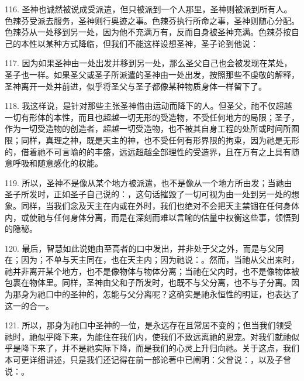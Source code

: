 116. 圣神也诚然被说成受派遣，但只被派到一个人那里，圣神则被派到所有人。色辣芬受派去服务，圣神则行奥迹之事。色辣芬执行所命之事，圣神则随心分配。色辣芬从一处移到另一处，因为他不充满万有，反而自身被圣神充满。色辣芬按自己的本性以某种方式降临，但我们不能这样设想圣神，圣子论到他说：\par

117. 因为如果圣神由一处出发并移到另一处，那么圣父自己也会被发现在某处，圣子也一样。如果圣父或圣子所派遣的圣神由一处出发，按照那些不虔敬的解释，圣神离开一处并前进，似乎将圣父与圣子都像某种物质身体一样留下了。\par

118. 我这样说，是针对那些主张圣神借由运动而降下的人。但圣父，祂不仅超越一切有形体的本性，而且也超越一切无形的受造物，不受任何地方的局限；圣子，作为一切受造物的创造者，超越一切受造物，也不被其自身工程的处所或时间所囿限；同样，真理之神，既是天主的神，也不受任何有形界限的拘束，因为祂是无形的，借着祂不可言喻的的丰盛，远远超越全部理性的受造界，且在万有之上具有随意呼吸和随意感化的权能。\par

119. 所以，圣神不是像从某个地方被派遣，也不是像从一个地方所由发；当祂由圣子所发时，正如圣子自己说的：，这句话摧毁了一切可视为由一处到另一处的想象。同样，当我们念及天主在内或在外时，我们也绝对不会把天主禁锢在任何身体内，或使祂与任何身体分离，而是在深刻而难以言喻的估量中权衡这些事，领悟到的隐秘。\par

120. 最后，智慧如此说她由至高者的口中发出，并非处于父之外，而是与父同在；因为；不单与天主同在，也在天主内；因为祂说：。然而，当祂从父出来时，祂并非离开某个地方，也不是像物体与物体分离；当祂在父内时，也不是像物体被包裹在物体里。同样，圣神由父和子所发时，也既不与父分离，也不与子分离。因为那身为祂口中的圣神的，怎能与父分离呢？这确实是祂永恒性的明证，也表达了这一的合一。\par

121. 所以，那身为祂口中圣神的一位，是永远存在且常居不变的；但当我们领受祂时，祂似乎降下来，为能住在我们内，使我们不致远离祂的恩宠。对我们就祂似乎是降下来了，并不是祂实际下降，而是我们的心灵上升归向祂。关于这点，我们本可更详细讲述，只是我们还记得在前一部论著中已阐明：父曾说：，以及子曾说：。\par

